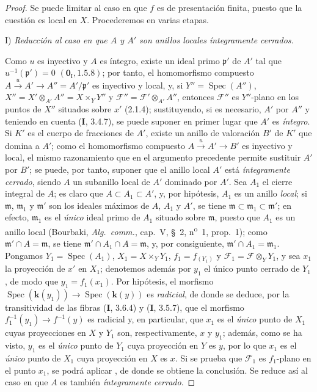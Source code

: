 \begin{proof}
Se puede limitar al caso en que $f$ es de presentación finita, puesto que la cuestión es local
en $X$. Procederemos en varias etapas.

\medskip
\noindent I) \emph{Reducción al caso en que $A$ y $A'$ son anillos locales íntegramente cerrados.}

\medskip
Como $u$ es inyectivo y $A$ es íntegro, existe un ideal primo $\mathfrak p'$ de $A'$ tal que
$u^{-1}(\mathfrak p')=0$ $(\mathbf 0_{\mathrm I},1.5.8)$; por tanto, el homomorfismo compuesto $A\xrightarrow{u}A'\to A''=A'/\mathfrak p'$ es inyectivo
y local, y, si $Y''=\operatorname{Spec}(A'')$, $X''=X'\otimes_{A'}A''=X\times_Y Y''$ y $\mathcal F''=\mathcal F'\otimes_{A'}A''$, entonces $\mathcal F''$ es $Y''$-plano
en los puntos de $X''$ situados sobre $x'$ (2.1.4); sustituyendo, si es necesario, $A'$ por $A''$ y teniendo
en cuenta (\textbf I, 3.4.7), se puede suponer en primer lugar que $A'$ es \emph{íntegro}. Si $K'$ es el cuerpo de
fracciones de $A'$, existe un anillo de valoración $B'$ de $K'$ que domina a $A'$; como el homomorfismo compuesto
$A\xrightarrow{u}A'\to B'$ es inyectivo y local, el mismo razonamiento que en
el argumento precedente permite sustituir $A'$ por $B'$; se puede, por tanto, suponer que el anillo local $A'$ está \emph{íntegramente cerrado},
siendo $A$ un subanillo local de $A'$ dominado por $A'$. Sea $A_1$ el cierre integral de $A$; es claro que
$A\subset A_1\subset A'$, y, por hipótesis, $A_1$ es un anillo \emph{local};
si $\mathfrak m$, $\mathfrak m_1$ y $\mathfrak m'$ son los ideales máximos de $A$, $A_1$ y $A'$, se tiene $\mathfrak m\subset\mathfrak m_1\subset\mathfrak m'$; en efecto, $\mathfrak m_1$ es
el \emph{único} ideal primo de $A_1$ situado sobre $\mathfrak m$, puesto que $A_1$ es un anillo local (Bourbaki,
\emph{Alg.\ comm.}, cap.~V, \S~2, n\textsuperscript{o}~1, prop.~1); como $\mathfrak m'\cap A=\mathfrak m$, se tiene $\mathfrak m'\cap A_1\cap A=\mathfrak m$,
y, por consiguiente, $\mathfrak m'\cap A_1=\mathfrak m_1$. Pongamos $Y_1=\operatorname{Spec}(A_1)$, $X_1=X\times_Y Y_1$, $f_1=f_{(Y_1)}$ y $\mathcal F_1=\mathcal F\otimes_Y Y_1$, y
sea $x_1$ la proyección de $x'$ en $X_1$; denotemos además por $y_1$ el único punto cerrado
de $Y_1$, de modo que $y_1=f_1(x_1)$. Por hipótesis, el morfismo $\operatorname{Spec}(\boldsymbol{k}(y_1))\to\operatorname{Spec}(\boldsymbol{k}(y))$
es \emph{radicial}, de donde se deduce, por la transitividad de las fibras (\textbf I, 3.6.4) y (\textbf I, 3.5.7), que
el morfismo $f_1^{-1}(y_1)\to f^{-1}(y)$ es radicial y, en particular, que $x_1$ es el \emph{único} punto de $X_1$
cuyas proyecciones en $X$ y $Y_1$ son, respectivamente, $x$ y $y_1$; además, como se ha visto, $y_1$
es el \emph{único} punto de $Y_1$ cuya proyección en $Y$ es $y$, por lo que $x_1$ es el \emph{único} punto de $X_1$
cuya proyección en $X$ es $x$. Si se prueba que $\mathcal F_1$ es $f_1$-plano en el punto $x_1$, se podrá aplicar , de donde se obtiene la conclusión. Se reduce así al caso en que $A$
es también \emph{íntegramente cerrado}.


\end{proof}
